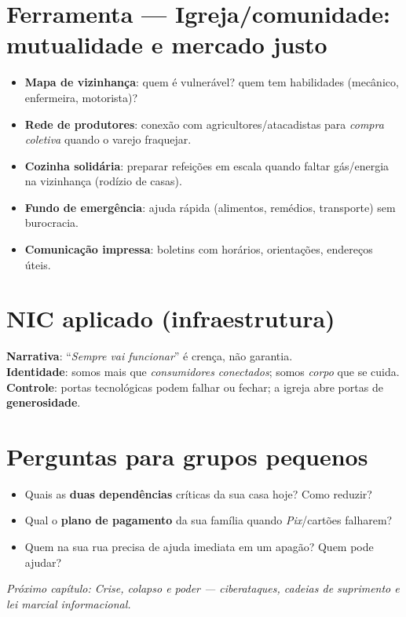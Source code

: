 \section{Ferramenta --- Igreja/comunidade: mutualidade e mercado justo}
\begin{checklist}
\begin{itemize}[leftmargin=*,noitemsep]
  \item \textbf{Mapa de vizinhança}: quem é vulnerável? quem tem habilidades (mecânico, enfermeira, motorista)?
  \item \textbf{Rede de produtores}: conexão com agricultores/atacadistas para \emph{compra coletiva} quando o varejo fraquejar.
  \item \textbf{Cozinha solidária}: preparar refeições em escala quando faltar gás/energia na vizinhança (rodízio de casas).
  \item \textbf{Fundo de emergência}: ajuda rápida (alimentos, remédios, transporte) sem burocracia.
  \item \textbf{Comunicação impressa}: boletins com horários, orientações, endereços úteis.
\end{itemize}
\end{checklist}

\section{NIC aplicado (infraestrutura)}
\begin{nicbox}
\textbf{Narrativa}: “\emph{Sempre vai funcionar}” é crença, não garantia.\\
\textbf{Identidade}: somos mais que \emph{consumidores conectados}; somos \emph{corpo} que se cuida.\\
\textbf{Controle}: portas tecnológicas podem falhar ou fechar; a igreja abre portas de \textbf{generosidade}.
\end{nicbox}

\section{Perguntas para grupos pequenos}
\begin{itemize}[leftmargin=*,noitemsep]
  \item Quais as \textbf{duas dependências} críticas da sua casa hoje? Como reduzir?
  \item Qual o \textbf{plano de pagamento} da sua família quando \emph{Pix}/cartões falharem?
  \item Quem na sua rua precisa de ajuda imediata em um apagão? Quem pode ajudar?
\end{itemize}

\bigskip
\noindent\textit{Próximo capítulo: Crise, colapso e poder --- ciberataques, cadeias de suprimento e lei marcial informacional.}
